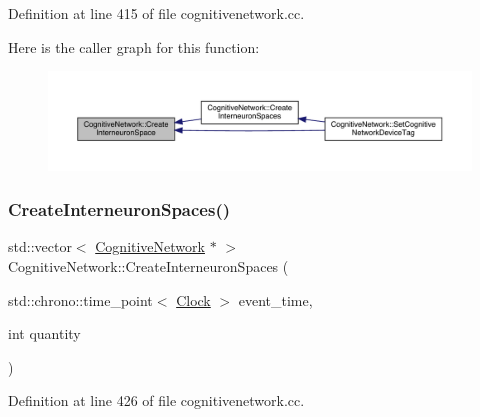 Definition at line 415 of file cognitivenetwork.\+cc.

Here is the caller graph for this function\+:
\nopagebreak
\begin{figure}[H]
\begin{center}
\leavevmode
\includegraphics[width=350pt]{class_cognitive_network_af0dc86c7905baae6f2b5efb3a65b8819_icgraph}
\end{center}
\end{figure}
\mbox{\label{class_cognitive_network_a2d671451d659079d5efb5cda10e48827}} 
\subsubsection{\texorpdfstring{Create\+Interneuron\+Spaces()}{CreateInterneuronSpaces()}}
{\footnotesize\ttfamily std\+::vector$<$ \hyperlink{class_cognitive_network}{Cognitive\+Network} $\ast$ $>$ Cognitive\+Network\+::\+Create\+Interneuron\+Spaces (\begin{DoxyParamCaption}\item[{std\+::chrono\+::time\+\_\+point$<$ \hyperlink{universe_8h_a0ef8d951d1ca5ab3cfaf7ab4c7a6fd80}{Clock} $>$}]{event\+\_\+time,  }\item[{int}]{quantity }\end{DoxyParamCaption})}



Definition at line 426 of file cognitivenetwork.\+cc.

